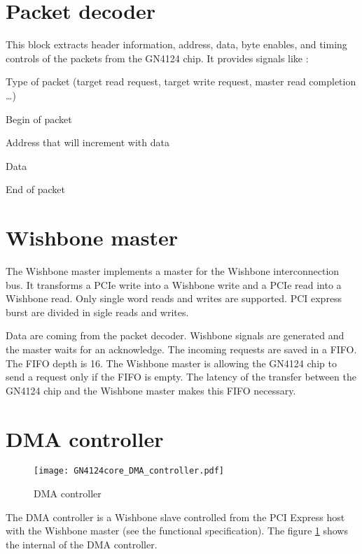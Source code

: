 \documentclass[10pt,a4paper]{cerndoc}
\begin{document}
  \section{Packet decoder}
    This block extracts header information, address, data, byte enables, and timing controls of the packets from the GN4124 chip. It provides signals like :
\begin{packed_item}
  \item Type of packet (target read request, target write request, master read completion \dots) 
  \item Begin of packet  
  \item Address that will increment with data
  \item Data
  \item End of packet   
\end{packed_item}

\section{Wishbone master}
  The Wishbone master implements a master for the Wishbone interconnection bus. It transforms a PCIe write into a Wishbone write and a PCIe read into a Wishbone read. Only single word reads and writes are supported. PCI express burst are divided in sigle reads and writes.
  
  Data are coming from the packet decoder. Wishbone signals are generated and the master waits for an acknowledge. The incoming requests are saved in a FIFO. The FIFO depth is 16. The Wishbone master is allowing the GN4124 chip to send a request only if the FIFO is empty. The latency of the transfer between the GN4124 chip and the Wishbone master makes this FIFO necessary.



\section{DMA controller}
  
\begin{figure}[!ht]
  \centering
  \texttt{[image: GN4124core\_DMA\_controller.pdf]}
  \caption{DMA controller}
  \label{fig:GN4124core_dma_ctrl}
\end{figure}
  
The DMA controller is a Wishbone slave controlled from the PCI Express host with the Wishbone master (see the functional specification). The figure \ref{fig:GN4124core_dma_ctrl} shows the internal of the DMA controller.
\end{document}
